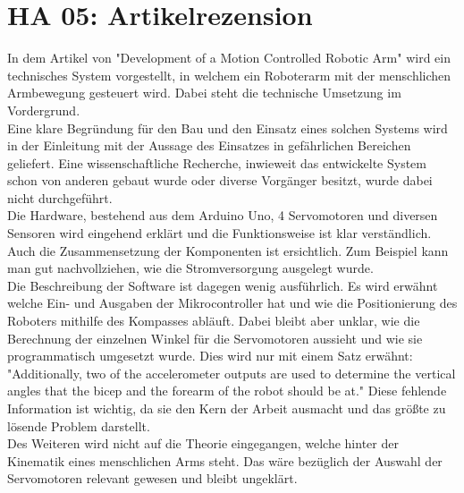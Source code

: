\section{HA 05: Artikelrezension}
  In dem Artikel von \cite{jiang_development_2017} "Development of a Motion Controlled Robotic Arm" wird ein technisches System vorgestellt, in welchem ein Roboterarm mit der menschlichen Armbewegung gesteuert wird. Dabei steht die technische Umsetzung im Vordergrund.\\
  Eine klare Begründung für den Bau und den Einsatz eines solchen Systems wird in der Einleitung mit der Aussage des Einsatzes in gefährlichen Bereichen geliefert. Eine wissenschaftliche Recherche, inwieweit das entwickelte System schon von anderen gebaut wurde oder diverse Vorgänger besitzt, wurde dabei nicht durchgeführt.\\
  Die Hardware, bestehend aus dem Arduino Uno, 4 Servomotoren und diversen Sensoren wird eingehend erklärt und die Funktionsweise ist klar verständlich. Auch die Zusammensetzung der Komponenten ist ersichtlich. Zum Beispiel kann man gut nachvollziehen, wie die Stromversorgung ausgelegt wurde.\\
  Die Beschreibung der Software ist dagegen wenig ausführlich. Es wird erwähnt welche Ein- und Ausgaben der Mikrocontroller hat und wie die Positionierung des Roboters mithilfe des Kompasses abläuft. Dabei bleibt aber unklar, wie die Berechnung der einzelnen Winkel für die Servomotoren aussieht und wie sie programmatisch umgesetzt wurde. Dies wird nur mit einem Satz erwähnt: "Additionally, two of the accelerometer outputs are used to determine the vertical angles that the bicep and the forearm of the robot should be at." Diese fehlende Information ist wichtig, da sie den Kern der Arbeit ausmacht und das größte zu lösende Problem darstellt.\\
  Des Weiteren wird nicht auf die Theorie eingegangen, welche hinter der Kinematik eines menschlichen Arms steht. Das wäre bezüglich der Auswahl der Servomotoren relevant gewesen und bleibt ungeklärt.
